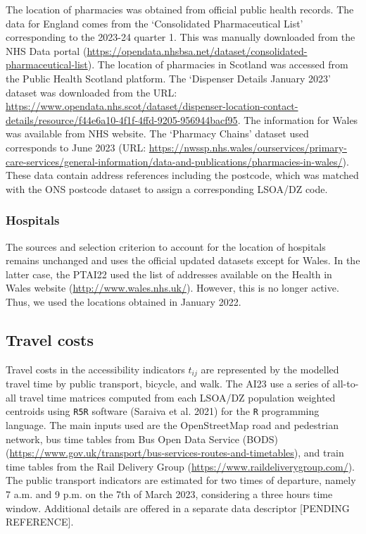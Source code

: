 \documentclass{article}
\begin{document}
The location of pharmacies was obtained from official public health
records. The data for England comes from the `Consolidated
Pharmaceutical List' corresponding to the 2023-24 quarter 1. This was
manually downloaded from the NHS Data portal
(\url{https://opendata.nhsbsa.net/dataset/consolidated-pharmaceutical-list}).
The location of pharmacies in Scotland was accessed from the Public
Health Scotland platform. The `Dispenser Details January 2023' dataset
was downloaded from the URL:
\url{https://www.opendata.nhs.scot/dataset/dispenser-location-contact-details/resource/f44e6a10-4f1f-4ffd-9205-956944bacf95}.
The information for Wales was available from NHS website. The `Pharmacy
Chains' dataset used corresponds to June 2023 (URL:
\url{https://nwssp.nhs.wales/ourservices/primary-care-services/general-information/data-and-publications/pharmacies-in-wales/}).
These data contain address references including the postcode, which was
matched with the ONS postcode dataset to assign a corresponding LSOA/DZ
code.

\hypertarget{hospitals}{%
\subsubsection{Hospitals}\label{hospitals}}

The sources and selection criterion to account for the location of
hospitals remains unchanged and uses the official updated datasets
except for Wales. In the latter case, the PTAI22 used the list of
addresses available on the Health in Wales website
(\url{http://www.wales.nhs.uk/}). However, this is no longer active.
Thus, we used the locations obtained in January 2022.

\hypertarget{travel-costs}{%
\subsection{Travel costs}\label{travel-costs}}

Travel costs in the accessibility indicators \(t_{ij}\) are represented
by the modelled travel time by public transport, bicycle, and walk. The
AI23 use a series of all-to-all travel time matrices computed from each
LSOA/DZ population weighted centroids using \texttt{R5R} software
(Saraiva et al. 2021) for the \texttt{R} programming language. The main
inputs used are the OpenStreetMap road and pedestrian network, bus time
tables from Bus Open Data Service (BODS)
(\url{https://www.gov.uk/transport/bus-services-routes-and-timetables}),
and train time tables from the Rail Delivery Group
(\url{https://www.raildeliverygroup.com/}). The public transport
indicators are estimated for two times of departure, namely 7 a.m. and 9
p.m. on the 7th of March 2023, considering a three hours time window.
Additional details are offered in a separate data descriptor {[}PENDING
REFERENCE{]}.
\end{document}
